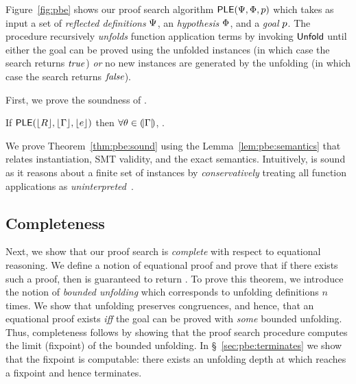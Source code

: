 %
Figure~\ref{fig:pbe} shows our proof search algorithm
$\mathsf{PLE}(\Psi,\Phi,p)$ which takes as input
%
a set of \emph{reflected definitions} $\Psi$,
%
an \emph{hypothesis} $\Phi$, and
%
a \emph{goal} $p$.
%
The \pbename procedure recursively \emph{unfolds}
function application terms by invoking $\mathsf{Unfold}$
until either the goal can be proved using the
unfolded instances (in which case the search
returns $\mathit{true}$) \emph{or} no new instances
are generated by the unfolding (in which case
the search returns $\mathit{false}$).

%
First, we prove the soundness of \pbesym. %

\begin{theorem} \label{thm:pbe:sound}
If   $\mathsf{PLE}(\lfloor R\rfloor ,\lfloor \Gamma\rfloor ,\lfloor e\rfloor )$
then $\forall \theta\in(\!|\Gamma|\!)$,
.
\end{theorem}

We prove Theorem~\ref{thm:pbe:sound}
using the Lemma~\ref{lem:pbe:semantics} %
that relates instantiation, SMT validity,
and the exact semantics.
%
Intuitively, \pbesym is sound as it
reasons about a finite set of instances
by \emph{conservatively} treating all
function applications as \emph{uninterpreted}~\cite{Nelson81}.

\subsection{Completeness} \label{sec:pbe:complete}

Next, we show that our proof search
is \emph{complete} with respect to
equational reasoning.
%
We define a notion of equational
proof
and prove that
if there exists such a proof,
then
is guaranteed to return \ttrue.
%
To prove this theorem, we introduce
the notion of \emph{bounded unfolding}
which corresponds to unfolding
definitions $n$ times.
%
We show that unfolding preserves
congruences, and hence, that an equational
proof exists \textit{iff} the goal can be proved with
\emph{some} bounded unfolding.
%
Thus, completeness follows by showing that
the proof search procedure computes the limit
(\ie fixpoint) of the bounded unfolding.
%
In \S~\ref{sec:pbe:terminates}
we show that the fixpoint is computable:
there exists an unfolding depth at which \pbesym
reaches a fixpoint and hence terminates.

